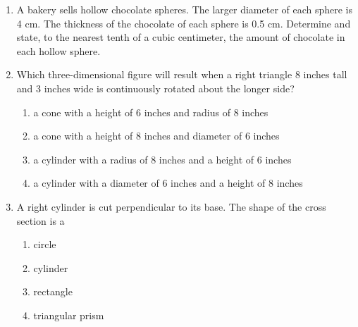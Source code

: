 \documentclass[12pt, twoside]{article}
\begin{document}
\begin{enumerate}
  \item A bakery sells hollow chocolate spheres. The larger diameter of each sphere is 4 cm. The thickness of the chocolate of each sphere is 0.5 cm. Determine and state, to the nearest tenth of a cubic centimeter, the amount of chocolate in each hollow sphere.\\[0.5cm]

\item Which three-dimensional figure will result when a right triangle 8 inches tall and 3 inches wide is continuously rotated about the longer side?
  \begin{enumerate}
    \item a cone with a height of 6 inches and radius of 8 inches
    \item a cone with a height of 8 inches and diameter of 6 inches
    \item a cylinder with a radius of 8 inches and a height of 6 inches
    \item a cylinder with a diameter of 6 inches and a height of 8 inches
  \end{enumerate}

  \item A right cylinder is cut perpendicular to its base. The shape of the cross section is a
    \begin{enumerate}
      \item circle
      \item cylinder
      \item rectangle
      \item triangular prism
    \end{enumerate}

\newpage


\end{enumerate}
\end{document}
